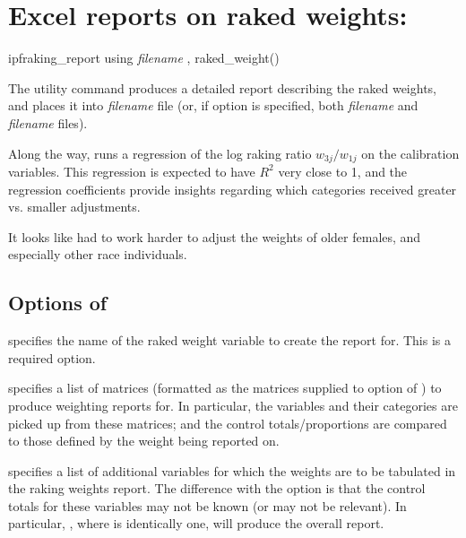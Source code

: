 \section{Excel reports on raked weights:  }

\begin{stsyntax}
ipfraking\_report
using \textit{filename}
,
raked\_weight(\varname)
\end{stsyntax}

The utility command  produces a detailed report
describing the raked weights, and places it into \textit{filename} file
(or, if  option is specified, both \textit{filename} and \textit{filename}
files).

Along the way,  runs a regression of the log raking ratio $w_{3j}/w_{1j}$
on the calibration variables. This regression is expected to have $R^2$ very close to 1,
and the regression coefficients provide insights regarding which categories received
greater vs. smaller adjustments.

\cnp

\begin{stlog}
\nullskip
\end{stlog}

It looks like  had to work harder to adjust the weights of older females,
and especially other race individuals.

\subsection{Options of }

\hangpara
{} specifies the name of the raked weight variable to create
    the report for. This is a required option.

\hangpara
{} specifies a list of matrices (formatted as the matrices
    supplied to  option of ) to produce weighting reports for.
    In particular, the variables and their categories are picked up from these matrices;
    and the control totals/proportions are compared to those defined by the weight being reported on.

\hangpara
{} specifies a list of additional variables for which the weights are to
    be tabulated in the raking weights report. The difference with the  option
    is that the control totals for these variables may not be known (or may not be relevant).
    In particular, , where  is identically one, will produce
    the overall report.

